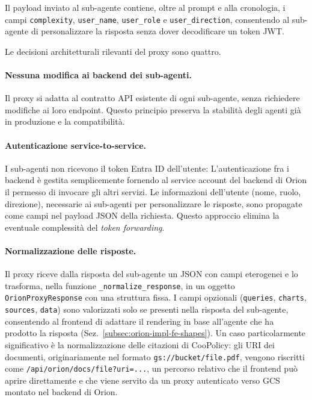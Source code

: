 Il payload inviato al sub-agente contiene, oltre al prompt e alla cronologia,
i campi \texttt{complexity}, \texttt{user\_name}, \texttt{user\_role} e \texttt{user\_direction},
consentendo al sub-agente di personalizzare la risposta senza dover decodificare un token JWT.

Le decisioni architetturali rilevanti del proxy sono quattro.

\paragraph{Nessuna modifica ai backend dei sub-agenti.} Il proxy si adatta al contratto API esistente di ogni sub-agente,
senza richiedere modifiche ai loro endpoint. Questo principio preserva la stabilità degli agenti già in produzione e la compatibilità.

\paragraph{Autenticazione service-to-service.} I sub-agenti non ricevono il token Entra ID dell'utente:
L'autenticazione fra i backend è gestita semplicemente fornendo al service account del backend di Orion il permesso di invocare gli altri servizi.
Le informazioni dell'utente (nome, ruolo, direzione), necessarie ai sub-agenti per personalizzare le risposte,
sono propagate come campi nel payload JSON della richiesta.
Questo approccio elimina la eventuale complessità del \emph{token forwarding}.

\paragraph{Normalizzazione delle risposte.} Il proxy riceve dalla risposta del sub-agente un JSON
con campi eterogenei e lo trasforma, nella funzione \texttt{\_normalize\_response},
in un oggetto \texttt{OrionProxyResponse} con una struttura fissa.
I campi opzionali (\texttt{queries}, \texttt{charts}, \texttt{sources}, \texttt{data})
sono valorizzati solo se presenti nella risposta del sub-agente,
consentendo al frontend di adattare il rendering in base all'agente che ha
prodotto la risposta (Sez.~\ref{subsec:orion-impl-fe-shapes}).
Un caso particolarmente significativo è la normalizzazione delle citazioni di CooPolicy: gli URI dei documenti,
originariamente nel formato \texttt{gs://bucket/file.pdf}, vengono riscritti come \texttt{/api/orion/docs/file?uri=...},
un percorso relativo che il frontend può aprire direttamente e che viene servito da un proxy autenticato verso GCS montato nel backend di Orion.

